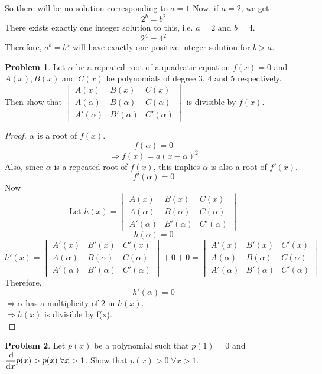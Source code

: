 \documentclass[14]{article}
\theoremstyle{definition}
\newtheorem{prob}{Problem}
\begin{document}
So there will be no solution corresponding to $a = 1$
Now, if $a = 2$, we get
\[2^b = b^2\]
There exists exactly one integer solution to this, i.e. $a = 2$ and $b = 4$.
\[2^4 = 4^2\]
Therefore, $a^b = b^a$ will have exactly one positive-integer solution for $b > a$.
\pagebreak
\begin{prob}
Let $\alpha$ be a repeated root of a quadratic equation $f(x) = 0$ and $A(x), B(x)$ and $C(x)$ be polynomials of degree 3, 4 and 5 respectively. Then show that $\begin{vmatrix}
A(x)&B(x)&C(x)\\A(\alpha)&B(\alpha)&C(\alpha)\\A'(\alpha)&B'(\alpha)&C'(\alpha)
\end{vmatrix}$ is divisible by $f(x)$.
\end{prob}
\begin{proof}
$\alpha$ is a root of $f(x)$. 
\[
f(\alpha) = 0
\]
\[
\Rightarrow f(x) = a(x - \alpha)^2
\]
Also, since $\alpha$ is a repeated root of $f(x)$, this implies $\alpha$ is also a root of $f'(x)$.
\[f'(\alpha) = 0\]
Now
\[\text{Let } h(x) = \begin{vmatrix}
A(x)&B(x)&C(x)\\A(\alpha)&B(\alpha)&C(\alpha)\\A'(\alpha)&B'(\alpha)&C'(\alpha)
\end{vmatrix}\]
\[h(\alpha) = 0\]
\[h'(x) = \begin{vmatrix}
A'(x)&B'(x)&C'(x)\\A(\alpha)&B(\alpha)&C(\alpha)\\A'(\alpha)&B'(\alpha)&C'(\alpha)
\end{vmatrix} + 0 + 0 = \begin{vmatrix}
A'(x)&B'(x)&C'(x)\\A(\alpha)&B(\alpha)&C(\alpha)\\A'(\alpha)&B'(\alpha)&C'(\alpha)
\end{vmatrix}\]
Therefore,
\[h'(\alpha) = 0\]
$\Rightarrow \alpha$ has a multiplicity of $2$ in $h(x)$.\\
$\Rightarrow h(x)$ is divisible by f(x).\\
\end{proof}
\begin{prob}
Let $p(x)$ be a polynomial such that $p(1) = 0$ and $\dfrac{\dif}{\dif x} p(x) > p(x) \; \forall x > 1$. Show that $p(x) > 0 \; \forall x > 1$. 
\end{prob}
\end{document}
